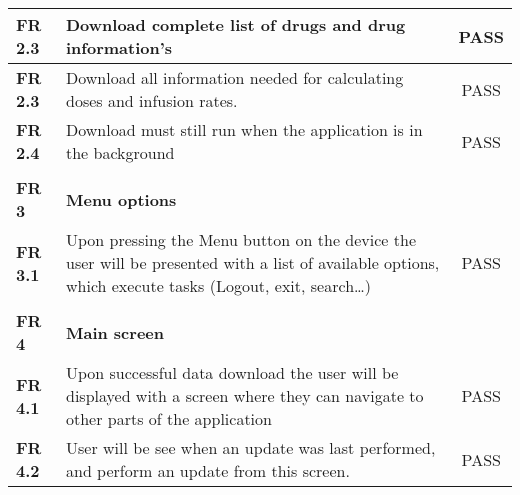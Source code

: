 \begin{center}
\begin{longtable}{| l | p{11cm} | c |}
\textbf{FR 2.3}                 & Download complete list of drugs and drug information's                                                                                                                     & PASS      \\ \hline
\textbf{FR 2.3}                 & Download all information needed for calculating doses and infusion rates.                                                                                                  & PASS      \\ \hline
\textbf{FR 2.4}                 & Download must still run when the application is in the background                                                                                                          & PASS      \\ \hline
\textbf{}                       &                                                                                                                                                                            &           \\ \hline
\textbf{FR 3}                   & \textbf{Menu options}                                                                                                                                                      &           \\ \hline
\textbf{FR 3.1}                 & Upon pressing the Menu button on the device the user will be presented with a list of available options, which execute tasks (Logout, exit, search…)                       & PASS      \\ \hline
\textbf{}                       &                                                                                                                                                                            &           \\ \hline
\textbf{FR 4}                   & \textbf{Main screen}                                                                                                                                                       &           \\ \hline
\textbf{FR 4.1}                 & Upon successful data download the user will be displayed with a screen where they can navigate to other parts of the application                                           & PASS      \\ \hline
\textbf{FR 4.2}                 & User will be see when an update was last performed, and perform an update from this screen.                                                                                & PASS      \\ \hline

\end{longtable}
\end{center}
